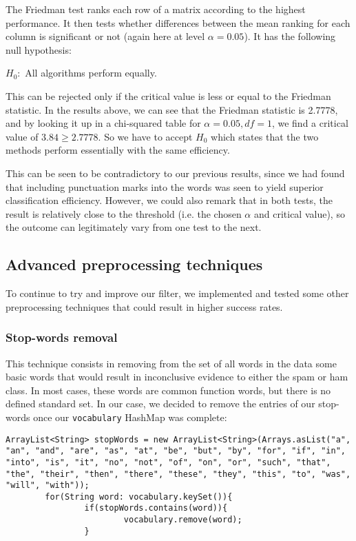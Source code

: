 \documentclass[12pt,a4paper]{report}
\begin{document}
The Friedman test ranks each row of a matrix according to the highest performance. It then tests whether differences between the mean ranking for each column is significant or not (again here at level $ \alpha = 0.05 $). It has the following null hypothesis:
 
\begin{center}
$ H_0: $ All algorithms perform equally.
\end{center}

This can be rejected only if the critical value is less or equal to the Friedman statistic. In the results above, we can see that the Friedman statistic is 2.7778, and by looking it up in a chi-squared table for $ \alpha = 0.05, df = 1 $, we find a critical value of $ 3.84 \geq 2.7778 $. So we have to accept $H_0$ which states that the two methods perform essentially with the same efficiency.

This can be seen to be contradictory to our previous results, since we had found that including punctuation marks into the words was seen to yield superior classification efficiency. However, we could also remark that in both tests, the result is relatively close to the threshold (i.e. the chosen $\alpha$ and critical value), so the outcome can legitimately vary from one test to the next.

\subsection{Advanced preprocessing techniques}
To continue to try and improve our filter, we implemented and tested some other preprocessing techniques that could result in higher success rates. 

\subsubsection{Stop-words removal}
This technique consists in removing from the set of all words in the data some basic words that would result in inconclusive evidence to either the spam or ham class. In most cases, these words are common function words, but there is no defined standard set. In our case, we decided to remove the entries of our stop-words once our \texttt{vocabulary} HashMap was complete:

\begin{lstlisting}
ArrayList<String> stopWords = new ArrayList<String>(Arrays.asList("a", "an", "and", "are", "as", "at", "be", "but", "by", "for", "if", "in", "into", "is", "it", "no", "not", "of", "on", "or", "such", "that", "the", "their", "then", "there", "these", "they", "this", "to", "was", "will", "with"));
        for(String word: vocabulary.keySet()){
                if(stopWords.contains(word)){
                        vocabulary.remove(word);
                }
\end{lstlisting}
\end{document}

